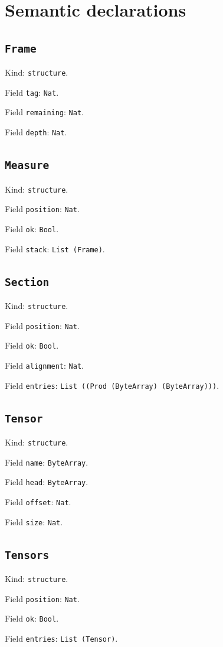 \documentclass[11pt]{article}
\begin{document}
\section*{Semantic declarations}
\subsection*{\texttt{Frame}}
\noindent Kind: \texttt{structure}.\par
\noindent Field \texttt{tag}: \texttt{Nat}.\par
\noindent Field \texttt{remaining}: \texttt{Nat}.\par
\noindent Field \texttt{depth}: \texttt{Nat}.\par
\subsection*{\texttt{Measure}}
\noindent Kind: \texttt{structure}.\par
\noindent Field \texttt{position}: \texttt{Nat}.\par
\noindent Field \texttt{ok}: \texttt{Bool}.\par
\noindent Field \texttt{stack}: \texttt{List (Frame)}.\par
\subsection*{\texttt{Section}}
\noindent Kind: \texttt{structure}.\par
\noindent Field \texttt{position}: \texttt{Nat}.\par
\noindent Field \texttt{ok}: \texttt{Bool}.\par
\noindent Field \texttt{alignment}: \texttt{Nat}.\par
\noindent Field \texttt{entries}: \texttt{List ((Prod (ByteArray) (ByteArray)))}.\par
\subsection*{\texttt{Tensor}}
\noindent Kind: \texttt{structure}.\par
\noindent Field \texttt{name}: \texttt{ByteArray}.\par
\noindent Field \texttt{head}: \texttt{ByteArray}.\par
\noindent Field \texttt{offset}: \texttt{Nat}.\par
\noindent Field \texttt{size}: \texttt{Nat}.\par
\subsection*{\texttt{Tensors}}
\noindent Kind: \texttt{structure}.\par
\noindent Field \texttt{position}: \texttt{Nat}.\par
\noindent Field \texttt{ok}: \texttt{Bool}.\par
\noindent Field \texttt{entries}: \texttt{List (Tensor)}.\par
\end{document}
